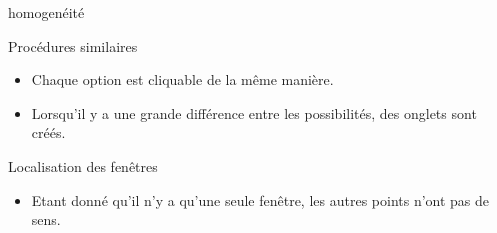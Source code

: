 \begin{frame}{homogenéité}
  \begin{block}{Procédures similaires}
    \begin{itemize}
    \item<pro@1-> Chaque option est cliquable de la même manière.
    \item<pro@1-> Lorsqu'il y a une grande différence entre les
      possibilités, des onglets sont créés.
    \end{itemize}
  \end{block}

  \begin{block}{Localisation des fenêtres}
    \begin{itemize}
    \item Etant donné qu'il n'y a qu'une seule fenêtre, les autres
      points n'ont pas de sens.
    \end{itemize}
  \end{block}

\end{frame}
